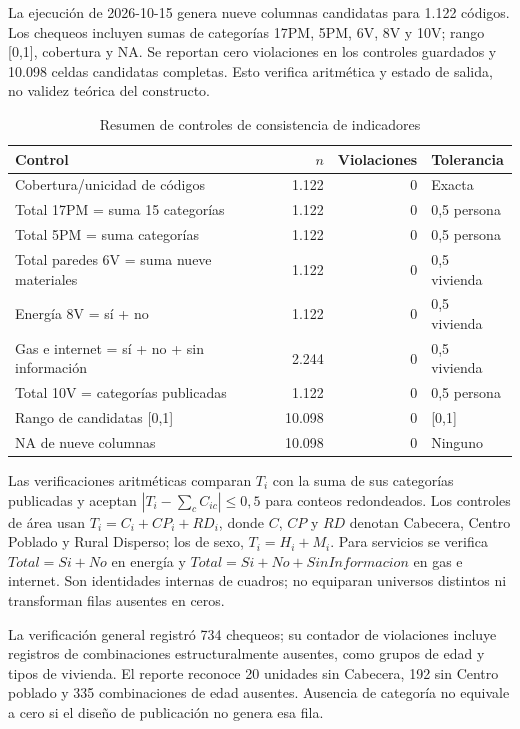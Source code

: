 \documentclass[11pt,a4paper]{article}
\begin{document}
La ejecución de 2026-10-15 genera nueve columnas candidatas para 1.122 códigos. Los chequeos incluyen sumas de categorías 17PM, 5PM, 6V, 8V y 10V; rango [0,1], cobertura y NA. Se reportan cero violaciones en los controles guardados y 10.098 celdas candidatas completas. Esto verifica aritmética y estado de salida, no validez teórica del constructo.

\begin{table}[htbp]
\centering\small
\caption{Resumen de controles de consistencia de indicadores}
\label{tab:controles}
\begin{tabularx}{\textwidth}{Y r r P{0.23\textwidth}}
\toprule
\textbf{Control} & \textbf{$n$} & \textbf{Violaciones} & \textbf{Tolerancia}\\
\midrule
Cobertura/unicidad de códigos & 1.122 & 0 & Exacta\\
Total 17PM = suma 15 categorías & 1.122 & 0 & 0,5 persona\\
Total 5PM = suma categorías & 1.122 & 0 & 0,5 persona\\
Total paredes 6V = suma nueve materiales & 1.122 & 0 & 0,5 vivienda\\
Energía 8V = sí + no & 1.122 & 0 & 0,5 vivienda\\
Gas e internet = sí + no + sin información & 2.244 & 0 & 0,5 vivienda\\
Total 10V = categorías publicadas & 1.122 & 0 & 0,5 persona\\
Rango de candidatas [0,1] & 10.098 & 0 & [0,1]\\
NA de nueve columnas & 10.098 & 0 & Ninguno\\
\bottomrule
\end{tabularx}
\end{table}

Las verificaciones aritméticas comparan $T_i$ con la suma de sus categorías publicadas y aceptan $|T_i-\sum_c C_{ic}|\leq0,5$ para conteos redondeados. Los controles de área usan $T_i=C_i+CP_i+RD_i$, donde $C$, $CP$ y $RD$ denotan Cabecera, Centro Poblado y Rural Disperso; los de sexo, $T_i=H_i+M_i$. Para servicios se verifica $Total=Si+No$ en energía y $Total=Si+No+SinInformacion$ en gas e internet. Son identidades internas de cuadros; no equiparan universos distintos ni transforman filas ausentes en ceros.

La verificación general registró 734 chequeos; su contador de violaciones incluye registros de combinaciones estructuralmente ausentes, como grupos de edad y tipos de vivienda. El reporte reconoce 20 unidades sin Cabecera, 192 sin Centro poblado y 335 combinaciones de edad ausentes. Ausencia de categoría no equivale a cero si el diseño de publicación no genera esa fila.
\end{document}
